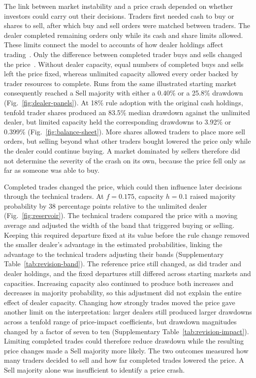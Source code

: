 The link between market instability and a price crash depended on whether
investors could carry out their decisions. Traders first needed cash to buy
or shares to sell, after which buy and sell orders were matched between
traders. The dealer completed remaining orders only while its cash and share
limits allowed. These limits connect the model to accounts of how dealer
holdings affect
trading~\cite{garman1976market,stoll1978supply,ho1981optimal,braunmunzinger2018agent}.
Only the difference between completed trader buys and sells changed the
price~\cite{kyle1985continuous,farmer2005predictive,bouchaud2009how}.
Without dealer capacity, equal numbers of completed buys and sells left the
price fixed, whereas unlimited capacity allowed every order backed by trader
resources to complete. Runs from the same illustrated starting market
consequently reached a Sell majority with either a 0.40\% or a 25.8\% drawdown (Fig.~\ref{fig:dealer-panels}). At 18\% rule adoption with the original cash holdings, tenfold
trader shares produced an 83.5\% median drawdown against the unlimited
dealer, but limited capacity held the corresponding drawdowns to 3.92\% or 0.399\% (Fig.~\ref{fig:balance-sheet}). More shares allowed traders to place more sell orders, but selling
beyond what other traders bought lowered the price only while the dealer
could continue buying. A market dominated by sellers therefore did not
determine the severity of the crash on its own, because the price fell only
as far as someone was able to buy.

Completed trades changed the price, which could then influence later
decisions through the technical traders. At $f=0.175$, capacity $h=0.1$ raised majority probability by 38 percentage points relative to the unlimited dealer (Fig.~\ref{fig:reservoir}). The technical traders compared the price with a moving average and adjusted
the width of the band that triggered buying or selling. Keeping this
required departure fixed at its value before the rule change removed the
smaller dealer's advantage in the estimated probabilities, linking the advantage to the technical traders adjusting their bands (Supplementary Table~\ref{tab:revision-band}). The reference price
still changed, as did trader and dealer holdings, and the fixed departures
still differed across starting markets and capacities. Increasing capacity
also continued to produce both increases and decreases in majority
probability, so this adjustment did not explain the entire effect of dealer
capacity. Changing how strongly trades moved the price gave another limit on
the interpretation: larger dealers still produced larger drawdowns across a
tenfold range of price-impact coefficients, but drawdown magnitudes changed by a factor of seven to ten (Supplementary Table~\ref{tab:revision-impact}). Limiting completed trades could therefore
reduce drawdown while the resulting price changes made a Sell majority more
likely. The two outcomes measured how many traders decided to sell and how
far completed trades lowered the price. A Sell majority alone was
insufficient to identify a price crash.

